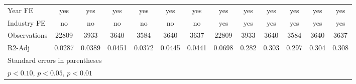 {\begin{tabular}{l*{12}{c}}
\hline
Year FE             &         yes         &         yes         &         yes         &         yes         &         yes         &         yes         &         yes         &         yes         &         yes         &         yes         &         yes         &         yes         \\
Industry FE         &          no         &          no         &          no         &          no         &          no         &          no         &         yes         &         yes         &         yes         &         yes         &         yes         &         yes         \\
Observations        &       22809         &        3933         &        3640         &        3584         &        3640         &        3637         &       22809         &        3933         &        3640         &        3584         &        3640         &        3637         \\
R2-Adj              &      0.0287         &      0.0389         &      0.0451         &      0.0372         &      0.0445         &      0.0441         &      0.0698         &       0.282         &       0.303         &       0.297         &       0.304         &       0.308         \\
\hline\hline
\multicolumn{13}{l}{\footnotesize Standard errors in parentheses}\\
\multicolumn{13}{l}{\footnotesize \sym{*} \(p<0.10\), \sym{**} \(p<0.05\), \sym{***} \(p<0.01\)}\\
\end{tabular}
}
